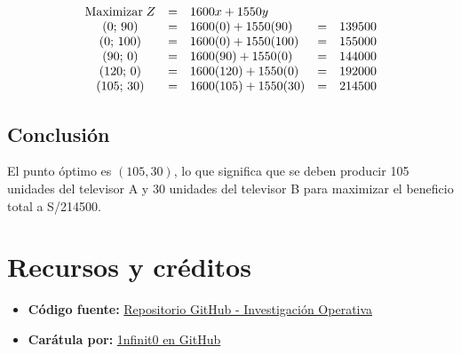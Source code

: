 \documentclass[12pt]{article}
\begin{document}
\vspace{-0.5cm}

\[
\begin{array}{c c l c l}
\text{Maximizar}\;Z & = & 1600x + 1550y        &   &        \\
(0;\, 90)           & = & 1600(0) + 1550(90)   & = & 139500 \\
(0;\, 100)          & = & 1600(0) + 1550(100)  & = & 155000 \\
(90;\, 0)           & = & 1600(90) + 1550(0)   & = & 144000 \\
(120;\, 0)          & = & 1600(120) + 1550(0)  & = & 192000 \\
(105;\, 30)         & = & 1600(105) + 1550(30) & = & 214500 \\
\end{array}
\]

\vspace{-0.5cm}

\subsection*{Conclusión}
El punto óptimo es $(105, 30)$, lo que significa que se deben producir 105 unidades del televisor A y 30 unidades del televisor B para maximizar el beneficio total a S/214500.

\newpage
\section*{Recursos y créditos}

\begin{itemize}
    \item \textbf{Código fuente:} \href{https://github.com/MateoTVara/C08-InvestigacionOperativa}{Repositorio GitHub - Investigación Operativa}
    \item \textbf{Carátula por:} \href{https://github.com/1nfinit0}{1nfinit0 en GitHub}
\end{itemize}
\end{document}
